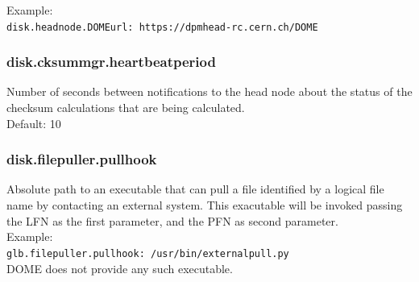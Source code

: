 \documentclass[a4paper,10pt]{scrreprt}
\begin{document}
Example:\\
\lstinline"disk.headnode.DOMEurl: https://dpmhead-rc.cern.ch/DOME"\\

\subsubsection{disk.cksummgr.heartbeatperiod}

Number of seconds between notifications to the head node about the status of the checksum calculations that are being calculated.\\

Default: 10\\


\subsubsection{disk.filepuller.pullhook}

Absolute path to an executable that can pull a file identified by a logical file name by contacting an external system. This exacutable
will be invoked passing the LFN as the first parameter, and the PFN as second parameter.\\

Example:\\
\lstinline"glb.filepuller.pullhook: /usr/bin/externalpull.py"\\

DOME does not provide any such executable.\\
\end{document}
